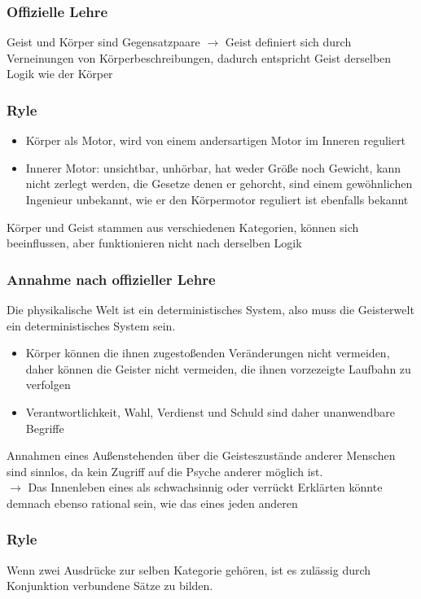 \documentclass[landscape, twocolumn]{scrartcl}
\begin{document}
\subsubsection*{Offizielle Lehre}
Geist und Körper sind Gegensatzpaare $\rightarrow$ Geist definiert sich durch Verneinungen von Körperbeschreibungen, dadurch entspricht Geist derselben Logik wie der Körper

\subsubsection*{Ryle}
\begin{itemize}
    \item
        Körper als Motor, wird von einem andersartigen Motor im Inneren reguliert
    \item
        Innerer Motor: unsichtbar, unhörbar, hat weder Größe noch Gewicht, kann nicht zerlegt werden, die Gesetze denen er gehorcht, sind einem gewöhnlichen Ingenieur unbekannt, wie er den Körpermotor reguliert ist ebenfalls bekannt
\end{itemize}
Körper und Geist stammen aus verschiedenen Kategorien, können sich beeinflussen, aber funktionieren nicht nach derselben Logik

\subsubsection*{Annahme nach offizieller Lehre}
Die physikalische Welt ist ein deterministisches System, also muss die Geisterwelt ein deterministisches System sein.
\begin{itemize}
    \item
        Körper können die ihnen zugestoßenden Veränderungen nicht vermeiden, daher können die Geister nicht vermeiden, die ihnen vorzezeigte Laufbahn zu verfolgen
    \item
        Verantwortlichkeit, Wahl, Verdienst und Schuld sind daher unanwendbare Begriffe
\end{itemize}
Annahmen eines Außenstehenden über die Geisteszustände anderer Menschen sind sinnlos, da kein Zugriff auf die Psyche anderer möglich ist.\\
$\rightarrow$ Das Innenleben eines als schwachsinnig oder verrückt Erklärten könnte demnach ebenso rational sein, wie das eines jeden anderen

\subsubsection*{Ryle}
Wenn zwei Ausdrücke zur selben Kategorie gehören, ist es zulässig durch Konjunktion verbundene Sätze zu bilden.
\end{document}
